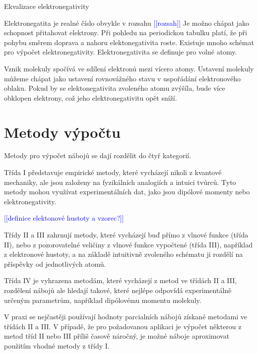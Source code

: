 \documentclass[10pt,draft,oneside]{fithesis2}
\newcommand\todo[1]{\textcolor{blue}{[[#1]]}}
\begin{document}
Ekvalizace elektronegativity

Elektronegatita je realné číslo obvykle v rozsahu \todo{rozsah} Je možno chápat jako schopnost přitahovat elektrony. Při pohledu na periodickou tabulku platí, že při pohybu směrem doprava a nahoru elektonegativita roste. Existuje mnoho schémat pro výpočet elektronegativity. Elektronegativita se definuje pro volné atomy.



Vznik molekuly spočívá ve sdílení elektronů mezi vícero atomy. Ustavení molekuly můžeme chápat jako ustavení rovnovážného stavu v uspořádání elektronového oblaku. Pokud by se elektonegativita zvoleného atomu zvýšíla, bude více obklopen elektrony, což jeho elektronegativitu opět sníží.

\section{Metody výpočtu}

Metody pro výpočet nábojů se dají rozdělit do čtyř kategorií. \citep[s.~50]{cramer2004essentials}

Třída I představuje empirické metody, které vycházejí nikoli z kvantové mechaniky, ale jsou založeny na fyzikálních analogiích a intuici tvůrců. Tyto metody mohou využívat experimentálních dat, jako jsou dipólové momenty nebo elektronegativity.

\todo{definice elektonové hustoty a vzorec?}

Třídy II a III zahrnují metody, které vycházejí buď přímo z vlnové funkce (třída II), nebo z pozorovatelné veličiny z vlnové funkce vypočtené (třída III), například z elektronové hustoty, a na základě intuitivně zvoleného schématu ji rozdělí na příspěvky od jednotlivých atomů.

Třída IV je vyhrazena metodám, které vycházejí z metod ve třídách II a III, rozdělení nábojů ale hledají takové, které nejlépe odpovídá experimentálně určeným parametrům, například dipólovému momentu molekuly.

V praxi se nejčastěji používají hodnoty parcialních nábojů získané metodami ve třídách II a III. V případě, že pro požadovanou aplikaci je výpočet některou z metod tříd II nebo III příliš časově náročný, je možné náboje aproximovat použitím vhodné metody z třídy I.

\end{document}

